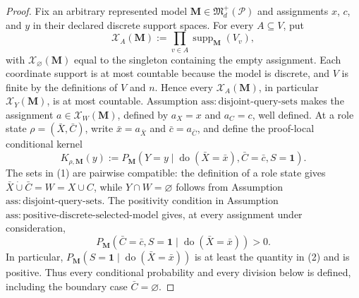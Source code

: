 \documentclass{article}
\begin{document}
\begin{proof}
Fix an arbitrary represented model \(\mathbf M\in\mathfrak M_d^+(\mathcal P)\) and assignments \(x\), \(c\), and \(y\) in their declared discrete support spaces.  For every \(A\subseteq V\), put
\[
 \mathcal X_A(\mathbf M)
 :=\prod_{v\in A}\operatorname{supp}_{\mathbf M}(V_v),
\]
with \(\mathcal X_{\varnothing}(\mathbf M)\) equal to the singleton containing the empty assignment.  Each coordinate support is at most countable because the model is discrete, and \(V\) is finite by the definitions of \(V\) and \(n\).  Hence every \(\mathcal X_A(\mathbf M)\), in particular \(\mathcal X_Y(\mathbf M)\), is at most countable.  Assumption \(\mathrm{ass{:}disjoint\text{-}query\text{-}sets}\) makes the assignment \(a\in\mathcal X_W(\mathbf M)\), defined by \(a_X=x\) and \(a_C=c\), well defined.  At a role state \(\rho=(\bar X,\bar C)\), write \(\bar x=a_{\bar X}\) and \(\bar c=a_{\bar C}\), and define the proof-local conditional kernel
\[
 K_{\rho,\mathbf M}(y)
 :=P_{\mathbf M}\!\left(
 Y=y\mid\operatorname{do}(\bar X=\bar x),
 \bar C=\bar c,S=\mathbf 1\right).
 \tag{1}
\]
The sets in (1) are pairwise compatible: the definition of a role state gives \(\bar X\mathbin{\dot\cup}\bar C=W=X\cup C\), while \(Y\cap W=\varnothing\) follows from Assumption \(\mathrm{ass{:}disjoint\text{-}query\text{-}sets}\).  The positivity condition in Assumption \(\mathrm{ass{:}positive\text{-}discrete\text{-}selected\text{-}model}\) gives, at every assignment under consideration,
\[
 P_{\mathbf M}\!\left(
 \bar C=\bar c,S=\mathbf 1
 \mid\operatorname{do}(\bar X=\bar x)\right)>0.
 \tag{2}
\]
In particular, \(P_{\mathbf M}(S=\mathbf 1\mid\operatorname{do}(\bar X=\bar x))\) is at least the quantity in (2) and is positive.  Thus every conditional probability and every division below is defined, including the boundary case \(\bar C=\varnothing\).


\end{proof}
\end{document}
